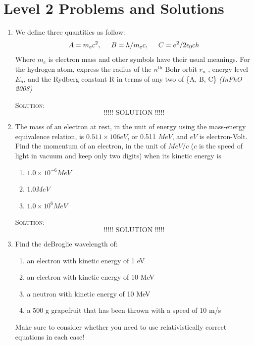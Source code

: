 \section{Level 2 Problems and Solutions}

\begin{enumerate}
\item We define three quantities as follow:
\[
A = {m_e}c^2,\hspace{0.5cm} B = h/{m_e}c,\hspace{0.5cm} C = e^2/2{\epsilon_0}ch
\]
Where $m_e$ is electron mass and other symbols have their usual meanings. For the hydrogen atom, express the radius of the $n^{\text{th}}$ Bohr orbit $r_n$ , energy level $E_n$, and the Rydberg constant R in terms of any two of \{A, B, C\} \hfill \textsl{(InPhO 2008)}

\textsc{Solution:}\\
\[
\text{!!!!! SOLUTION !!!!!}
\]

\item The mass of an electron at rest, in the unit of energy using the mass-energy equivalence relation, is $0.511 \times 106 eV$, or 0.511 $MeV$, and $eV$ is electron-Volt. Find the momentum of an electron, in the unit of $MeV/c$ ($c$ is the speed of light in vacuum and keep only two digits) when its kinetic energy is
\begin{enumerate}
    \item $1.0 \times 10^{-6} MeV$
    \item $1.0 MeV$
    \item $1.0 \times 10^{6} MeV$
\end{enumerate}

\textsc{Solution:}\\
\[
\text{!!!!! SOLUTION !!!!!}
\]

\item Find the deBroglie wavelength of:
\begin{enumerate}
    \item an electron with kinetic energy of 1 eV
    \item an electron with kinetic energy of 10 MeV
    \item a neutron with kinetic energy of 10 MeV
    \item a 500 g grapefruit that has been thrown with a speed of 10 m/s
\end{enumerate}

\begin{note}
Make sure to consider whether you need to use relativistically correct equations in each case!
\end{note}


\end{enumerate}
